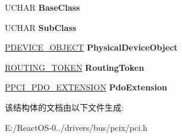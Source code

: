 \begin{DoxyCompactItemize}
\mbox{\label{struct___p_c_i___l_e_g_a_c_y___d_e_v_i_c_e_a2fd08c81dc50d2606d970e588b9be310}} 
U\+C\+H\+AR {\bfseries Base\+Class}
\item 
\mbox{\label{struct___p_c_i___l_e_g_a_c_y___d_e_v_i_c_e_a244ed46dff5d8767ae49516f10993170}} 
U\+C\+H\+AR {\bfseries Sub\+Class}
\item 
\mbox{\label{struct___p_c_i___l_e_g_a_c_y___d_e_v_i_c_e_a6778e6cf30e6f5c5f5486360cfa885a9}} 
\hyperlink{struct___d_e_v_i_c_e___o_b_j_e_c_t}{P\+D\+E\+V\+I\+C\+E\+\_\+\+O\+B\+J\+E\+CT} {\bfseries Physical\+Device\+Object}
\item 
\mbox{\label{struct___p_c_i___l_e_g_a_c_y___d_e_v_i_c_e_a9e6d65dc03a5114f00bd8d6a5f125e98}} 
\hyperlink{struct___r_o_u_t_i_n_g___t_o_k_e_n}{R\+O\+U\+T\+I\+N\+G\+\_\+\+T\+O\+K\+EN} {\bfseries Routing\+Token}
\item 
\mbox{\label{struct___p_c_i___l_e_g_a_c_y___d_e_v_i_c_e_a502631a05cbff502ae0573169d9c4cd7}} 
\hyperlink{struct___p_c_i___p_d_o___e_x_t_e_n_s_i_o_n}{P\+P\+C\+I\+\_\+\+P\+D\+O\+\_\+\+E\+X\+T\+E\+N\+S\+I\+ON} {\bfseries Pdo\+Extension}
\end{DoxyCompactItemize}


该结构体的文档由以下文件生成\+:\begin{DoxyCompactItemize}
\item 
E\+:/\+React\+O\+S-\/0../drivers/bus/pcix/pci.\+h\end{DoxyCompactItemize}

